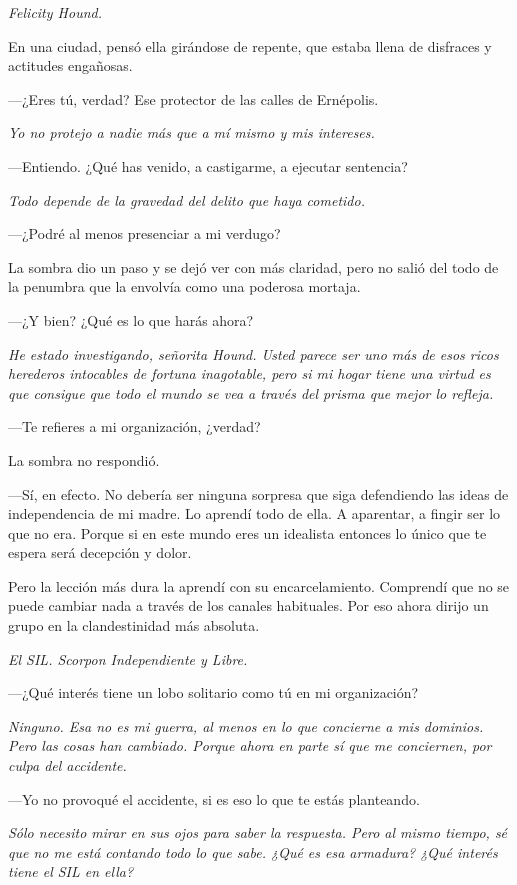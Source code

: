 \emph{Felicity Hound.}

En una ciudad, pensó ella girándose de repente, que estaba llena de disfraces y actitudes engañosas.

---¿Eres tú, verdad? Ese protector de las calles de Ernépolis.

\emph{Yo no protejo a nadie más que a mí mismo y mis intereses.}

---Entiendo. ¿Qué has venido, a castigarme, a ejecutar sentencia?

\emph{Todo depende de la gravedad del delito que haya cometido.}

---¿Podré al menos presenciar a mi verdugo?

La sombra dio un paso y se dejó ver con más claridad, pero no salió del todo de la penumbra que la envolvía como una poderosa mortaja.

---¿Y bien? ¿Qué es lo que harás ahora?

\emph{He estado investigando, señorita Hound. Usted parece ser uno más de esos ricos herederos intocables de fortuna inagotable, pero si mi hogar tiene una virtud es que consigue que todo el mundo se vea a través del prisma que mejor lo refleja.}

---Te refieres a mi organización, ¿verdad?

La sombra no respondió.

---Sí, en efecto. No debería ser ninguna sorpresa que siga defendiendo las ideas de independencia de mi madre. Lo aprendí todo de ella. A aparentar, a fingir ser lo que no era. Porque si en este mundo eres un idealista entonces lo único que te espera será decepción y dolor.

\rquoti{}Pero la lección más dura la aprendí con su encarcelamiento. Comprendí que no se puede cambiar nada a través de los canales habituales. Por eso ahora dirijo un grupo en la clandestinidad más absoluta.

\emph{El SIL. Scorpon Independiente y Libre.}

---¿Qué interés tiene un lobo solitario como tú en mi organización?

\emph{Ninguno. Esa no es mi guerra, al menos en lo que concierne a mis dominios. Pero las cosas han cambiado. Porque ahora en parte sí que me conciernen, por culpa del accidente.}

---Yo no provoqué el accidente, si es eso lo que te estás planteando.

\emph{Sólo necesito mirar en sus ojos para saber la respuesta. Pero al mismo tiempo, sé que no me está contando todo lo que sabe. ¿Qué es esa armadura? ¿Qué interés tiene el SIL en ella?}

